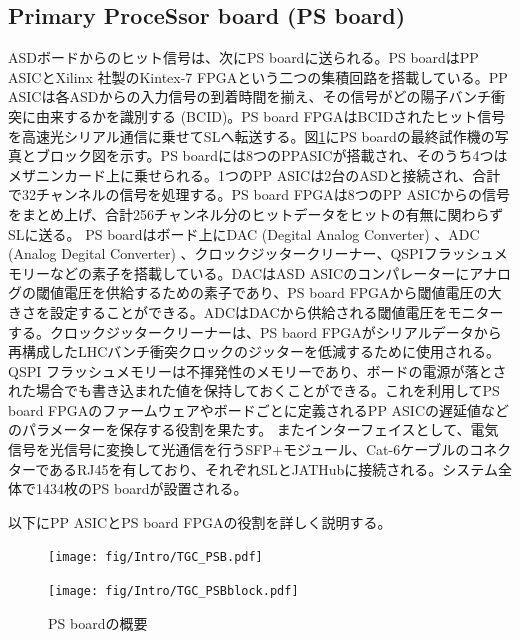         \subsection*{Primary ProceSsor board (PS board)}
    ASDボードからのヒット信号は、次にPS boardに送られる。PS boardはPP ASICとXilinx 社製のKintex-7 FPGAという二つの集積回路を搭載している。PP ASICは各ASDからの入力信号の到着時間を揃え、その信号がどの陽子バンチ衝突に由来するかを識別する (BCID)。PS board FPGAはBCIDされたヒット信号を高速光シリアル通信に乗せてSLへ転送する。図\ref{TGC_PSB}にPS boardの最終試作機の写真とブロック図を示す。PS boardには8つのPPASICが搭載され、そのうち4つはメザニンカード上に乗せられる。1つのPP ASICは2台のASDと接続され、合計で32チャンネルの信号を処理する。PS board FPGAは8つのPP ASICからの信号をまとめ上げ、合計256チャンネル分のヒットデータをヒットの有無に関わらずSLに送る。
    PS boardはボード上にDAC  (Degital Analog Converter) 、ADC  (Analog Degital Converter) 、クロックジッタークリーナー、QSPIフラッシュメモリーなどの素子を搭載している。DACはASD ASICのコンパレーターにアナログの閾値電圧を供給するための素子であり、PS board FPGAから閾値電圧の大きさを設定することができる。ADCはDACから供給される閾値電圧をモニターする。クロックジッタークリーナーは、PS baord FPGAがシリアルデータから再構成したLHCバンチ衝突クロックのジッターを低減するために使用される。QSPI フラッシュメモリーは不揮発性のメモリーであり、ボードの電源が落とされた場合でも書き込まれた値を保持しておくことができる。これを利用してPS board FPGAのファームウェアやボードごとに定義されるPP ASICの遅延値などのパラメーターを保存する役割を果たす。
    またインターフェイスとして、電気信号を光信号に変換して光通信を行うSFP+モジュール、Cat-6ケーブルのコネクターであるRJ45を有しており、それぞれSLとJATHubに接続される。システム全体で1434枚のPS boardが設置される。

    以下にPP ASICとPS board FPGAの役割を詳しく説明する。

    \begin{figure}
    \begin{minipage}[b]{.5\linewidth}
    \centering
    \texttt{[image: fig/Intro/TGC\_PSB.pdf]}
    \end{minipage}%
    \begin{minipage}[b]{.5\linewidth}
    \centering
    \texttt{[image: fig/Intro/TGC\_PSBblock.pdf]}
    \end{minipage}%
    \caption[PS boardの概要]{PS boardの概要}
    \label{TGC_PSB}
    \end{figure}


